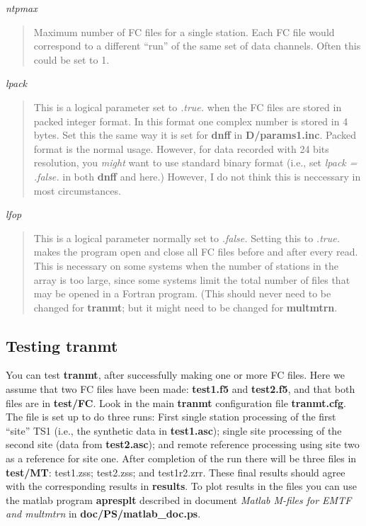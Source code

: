 {\it ntpmax}
\begin{quote}
Maximum number of FC files for a single station.  Each
FC file would correspond to a different ``run'' of the same set of
data channels.  Often this could be set to 1.
\end{quote}

{\it lpack}
\begin{quote}
This is a logical parameter
set to {\it .true.} when the FC files are
stored in packed integer format.  In this format one complex number
is stored in 4 bytes.  Set this the same way it is set for {\bf dnff}
in {\bf D/params1.inc}.
Packed format is the normal usage.  However, for data recorded with
24 bits resolution, you {\it might} want to use standard binary format
(i.e., set {\it lpack = .false.} in both {\bf dnff} and here.)
However, I do not think this is neccessary in most circumstances.
\end{quote}

{\it lfop }
\begin{quote}
This is a logical parameter normally set to {\it .false.}
Setting this to {\it .true.} makes the program open and close all
FC files before and after every read.  This is necessary on some systems
when the number of stations in the array is too large, since some systems
limit the total number of files that may be opened in a Fortran program.
(This should never need to be changed for {\bf tranmt}; but it might need
to be changed for {\bf multmtrn}.
\end{quote}

\subsection{Testing tranmt}

You can test {\bf tranmt}, after successfully making one or more FC files.
Here we assume that two FC files have been made: {\bf test1.f5} and
{\bf test2.f5}, and that both files are in {\bf test/FC}.
Look in the main {\bf tranmt} configuration file {\bf tranmt.cfg}.
The file is set up to do three runs: First single station processing of
the first ``site'' TS1 (i.e., the synthetic data in {\bf test1.asc});
single site processing of the second site (data from {\bf test2.asc});
and remote reference processing using site two as a reference for site one.
After completion of the run there will be three files in {\bf test/MT}:
test1.zss; test2.zss; and test1r2.zrr. 
These final results should agree with the corresponding results in
{\bf results}.  To plot results in the files you can use
the matlab program {\bf apresplt} described in document
{\it Matlab M-files for EMTF and multmtrn} in {\bf doc/PS/matlab\_doc.ps}.


